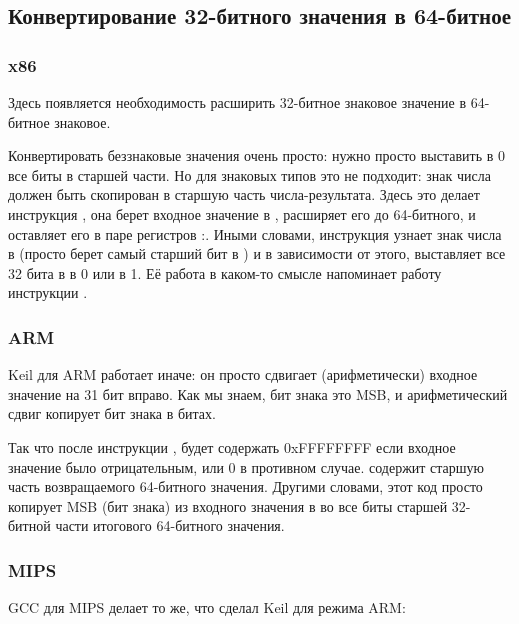 ﻿\subsection{Конвертирование 32-битного значения в 64-битное}
\label{subsec:sign_extending_32_to_64}



\subsubsection{x86}



Здесь появляется необходимость расширить 32-битное знаковое значение в 64-битное знаковое.

Конвертировать беззнаковые значения очень просто: нужно просто выставить в 0 все биты в старшей части.
Но для знаковых типов это не подходит: знак числа должен быть скопирован в старшую часть числа-результата.
Здесь это делает инструкция , она берет входное значение в \EAX{}, расширяет его до 64-битного,
и оставляет его в паре регистров \EDX{}:\EAX{}.
Иными словами, инструкция  узнает знак числа в \EAX{} (просто берет самый старший бит в \EAX{}) и в зависимости от этого,
выставляет все 32 бита в \EDX{} в 0 или в 1.
Её работа в каком-то смысле напоминает работу инструкции \MOVSX{}.

\subsubsection{ARM}



Keil для ARM работает иначе: он просто сдвигает (арифметически) входное значение на 31 бит вправо.
Как мы знаем, бит знака это \ac{MSB}, и арифметический сдвиг копирует бит знака в  битах.

Так что после инструкции ,  будет содержать 0xFFFFFFFF если входное значение
было отрицательным, или 0 в противном случае.
 содержит старшую часть возвращаемого 64-битного значения.
Другими словами, этот код просто копирует \ac{MSB} (бит знака) из входного значения в  во все
биты старшей 32-битной части итогового 64-битного значения.

\subsubsection{MIPS}

GCC для MIPS делает то же, что сделал Keil для режима ARM:



